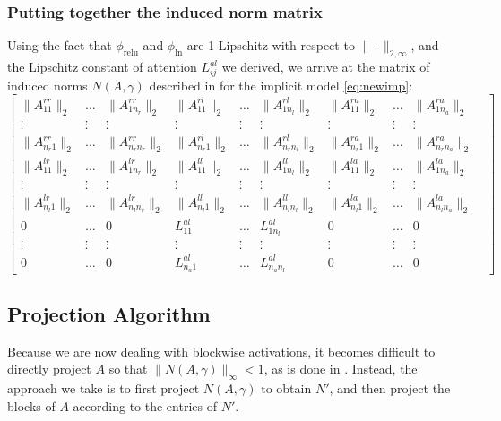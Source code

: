 \documentclass{article}
\begin{document}
\subsubsection{Putting together the induced norm matrix}
Using the fact that $\phi_\text{relu}$ and $\phi_\text{ln}$ are 1-Lipschitz with respect to $\|\cdot\|_{2,\infty}$, and 
the Lipschitz constant of attention $L^{al}_{ij}$ we derived, we arrive at the matrix of induced norms $N(A, \gamma)$
described in \citep{idl2019} for the implicit model \eqref{eq:newimp}:
\begin{equation*}
  \begin{bmatrix}
    \|A^{rr}_{11}\|_2 & \ldots & \|A^{rr}_{1n_r}\|_2 & \|A^{rl}_{11}\|_2 & \ldots & \|A^{rl}_{1n_l}\|_2 & \|A^{ra}_{11}\|_2 & \ldots & \|A^{ra}_{1n_a}\|_2 \\
    \vdots & \vdots & \vdots & \vdots & \vdots & \vdots & \vdots & \vdots & \vdots & \\
    \|A^{rr}_{n_r1}\|_2 & \ldots & \|A^{rr}_{n_rn_r}\|_2 & \|A^{rl}_{n_r1}\|_2 & \ldots & \|A^{rl}_{n_rn_l}\|_2 & \|A^{ra}_{n_r1}\|_2 & \ldots & \|A^{ra}_{n_rn_a}\|_2 \\
    \|A^{lr}_{11}\|_2 & \ldots & \|A^{lr}_{1n_r}\|_2 & \|A^{ll}_{11}\|_2 & \ldots & \|A^{ll}_{1n_l}\|_2 & \|A^{la}_{11}\|_2 & \ldots & \|A^{la}_{1n_a}\|_2 \\
    \vdots & \vdots & \vdots & \vdots & \vdots & \vdots & \vdots & \vdots & \vdots & \\
    \|A^{lr}_{n_l1}\|_2 & \ldots & \|A^{lr}_{n_ln_r}\|_2 & \|A^{ll}_{n_l1}\|_2 & \ldots & \|A^{ll}_{n_ln_l}\|_2 & \|A^{la}_{n_l1}\|_2 & \ldots & \|A^{la}_{n_ln_a}\|_2 \\
    0 & \ldots & 0 & L^{al}_{11} & \ldots & L^{al}_{1n_l} & 0 & \ldots & 0 \\
    \vdots & \vdots & \vdots & \vdots & \vdots & \vdots & \vdots & \vdots & \vdots \\
    0 & \ldots & 0 & L^{al}_{n_a1} & \ldots & L^{al}_{n_an_l} & 0 &\ldots & 0 
  \end{bmatrix}
\end{equation*}
\subsection{Projection Algorithm}
Because we are now dealing with blockwise activations, it becomes difficult to directly project $A$ so that 
$\|N(A, \gamma)\|_\infty < 1$, as is done in \citep{idl2019}. Instead, the approach we take is to first project 
$N(A, \gamma)$ to obtain $N'$, and then project the blocks of $A$ according to the entries of $N'$.
\end{document}

